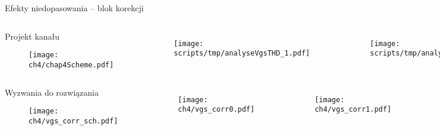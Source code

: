 \begin{frame}{Efekty niedopasowania -- blok korekcji}
\begin{columns}

    \begin{block}{
        Projekt kanału}
        \begin{figure}[H]
            \centering
            \texttt{[image: ch4/chap4Scheme.pdf]}
        \end{figure} 
        \end{block}




    \begin{columns}

    \begin{figure}[H]
        \centering
        \texttt{[image: scripts/tmp/analyseVgsTHD\_1.pdf]}
    \end{figure} 
    \begin{figure}[H]
        \centering
        \texttt{[image: scripts/tmp/analyseVgsTHD\_2.pdf]}
    \end{figure} 
    \end{columns}   
\end{columns}  

\begin{columns}

\begin{block}{
Wyzwania do rozwiązania}
\begin{figure}[H]
    \centering
    \texttt{[image: ch4/vgs\_corr\_sch.pdf]} 
\end{figure}   
\end{block}

    \begin{columns}

    \begin{figure}[H]
        \centering
        \texttt{[image: ch4/vgs\_corr0.pdf]}
    \end{figure} 
    \begin{figure}[H]
        \centering
        \texttt{[image: ch4/vgs\_corr1.pdf]}
    \end{figure} 
    \end{columns}   
\end{columns}  
\end{frame}


